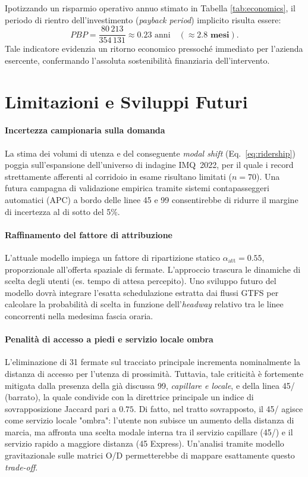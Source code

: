 \documentclass[conference]{IEEEtran}
\begin{document}
\noindent
Ipotizzando un risparmio operativo annuo stimato in Tabella \ref{tab:economics}, il periodo di rientro dell'investimento (\textit{payback period}) implicito risulta essere:
\begin{equation}
    PBP = \frac{80\,213}{354\,131} \approx 0.23 \text{ anni} \quad (\mathbf{\approx 2.8 \text{ mesi}}).
\end{equation}
Tale indicatore evidenzia un ritorno economico pressoché immediato per l'azienda esercente, confermando l'assoluta sostenibilità finanziaria dell'intervento.

\section{Limitazioni e Sviluppi Futuri}
\label{sec:discussion}

\paragraph{Incertezza campionaria sulla domanda}
La stima dei volumi di utenza e del conseguente \textit{modal shift} (Eq.~\ref{eq:ridership}) poggia sull'espansione dell'universo di indagine IMQ~2022, per il quale i record strettamente afferenti al corridoio in esame risultano limitati ($n=70$). Una futura campagna di validazione empirica tramite sistemi contapasseggeri automatici (APC) a bordo delle linee 45 e 99 consentirebbe di ridurre il margine di incertezza al di sotto del 5\%.

\paragraph{Raffinamento del fattore di attribuzione}
L'attuale modello impiega un fattore di ripartizione statico $\alpha_\text{att} = 0.55$, proporzionale all'offerta spaziale di fermate. L'approccio trascura le dinamiche di scelta degli utenti (es. tempo di attesa percepito). Uno sviluppo futuro del modello dovrà integrare l'esatta schedulazione estratta dai flussi GTFS per calcolare la probabilità di scelta in funzione dell'\textit{headway} relativo tra le linee concorrenti nella medesima fascia oraria.

\paragraph{Penalità di accesso a piedi e servizio locale ombra}
L'eliminazione di 31 fermate sul tracciato principale incrementa nominalmente la distanza di accesso per l'utenza di prossimità. Tuttavia, tale criticità è fortemente mitigata dalla presenza della già discussa 99, \emph{capillare e locale}, e della linea 45/ (barrato), la quale condivide con la direttrice principale un indice di sovrapposizione Jaccard pari a $0.75$. Di fatto, nel tratto sovrapposto, il 45/ agisce come servizio locale "ombra": l'utente non subisce un aumento della distanza di marcia, ma affronta una scelta modale interna tra il servizio capillare (45/) e il servizio rapido a maggiore distanza (45 Express). Un'analisi tramite modello gravitazionale sulle matrici O/D permetterebbe di mappare esattamente questo \textit{trade-off}.
\end{document}

